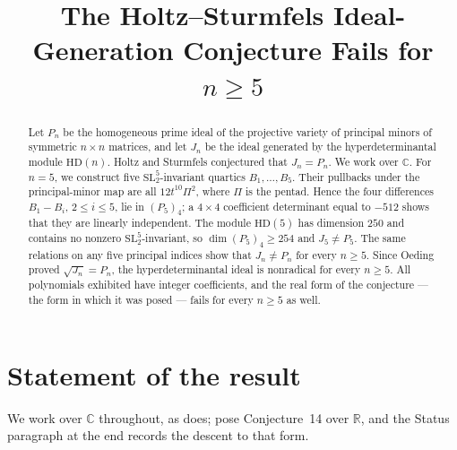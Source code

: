 \documentclass[11pt]{amsart}
\title[Failure of the Holtz--Sturmfels conjecture]
{The Holtz--Sturmfels Ideal-Generation Conjecture Fails for \(n\geq5\)}
\date{}
\theoremstyle{remark}
\newcommand{\C}{\mathbb C}
\newcommand{\HD}{\mathrm{HD}}
\begin{document}
\begin{abstract}
Let \(P_n\) be the homogeneous prime ideal of the projective variety of
principal minors of symmetric \(n\times n\) matrices, and let \(J_n\) be the
ideal generated by the hyperdeterminantal module \(\HD(n)\).
Holtz and Sturmfels conjectured that \(J_n=P_n\).
We work over \(\C\).
For \(n=5\), we construct five \(\mathrm{SL}_2^5\)-invariant quartics
\(B_1,\dots,B_5\). Their pullbacks under the principal-minor map are all
\(12t^{10}\Pi^2\), where \(\Pi\) is the pentad. Hence the four differences
\(B_1-B_i\), \(2\leq i\leq5\), lie in \((P_5)_4\); a \(4\times4\)
coefficient determinant equal to \(-512\) shows that they are linearly
independent. The module \(\HD(5)\) has dimension \(250\) and contains no
nonzero \(\mathrm{SL}_2^5\)-invariant, so
\(\dim(P_5)_4\geq254\) and \(J_5\neq P_5\).
The same relations on any five principal indices show that
\(J_n\neq P_n\) for every \(n\geq5\). Since Oeding proved
\(\sqrt{J_n}=P_n\), the hyperdeterminantal ideal is nonradical for every
\(n\geq5\). All polynomials exhibited have integer coefficients, and the
real form of the conjecture --- the form in which it was posed --- fails
for every \(n\geq5\) as well.
\end{abstract}

\maketitle

\section{Statement of the result}\label{sec:statement}

We work over \(\C\) throughout, as \cite{Oeding} does; \cite{HS} pose
Conjecture~14 over \(\mathbb R\), and the Status paragraph at the end
records the descent to that form.
\end{document}
